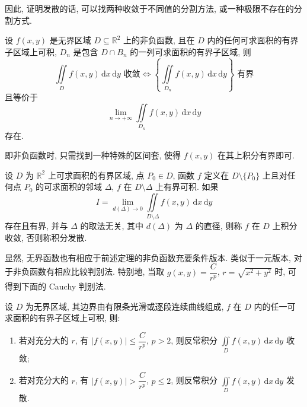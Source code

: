 \documentclass[../数学分析培优讲义.tex]{subfiles}
\begin{document}
\begin{remark}
因此, 证明发散的话, 可以找两种收敛于不同值的分割方法, 或一种极限不存在的分割方式.
\end{remark}

\begin{theorem}[\markstar]
设 $f(x,y)$ 是无界区域 $D\subseteq\mathbb{R}^2$ 上的非负函数, 且在 $D$ 内的任何可求面积的有界子区域上可积, $D_n$ 是包含 $D\cap B_n$ 的一列可求面积的有界子区域, 则
\[
    \iint\limits_D f(x,y)\,\mathrm{d}x\,\mathrm{d}y\text{ 收敛}
    \iff
    \left\{\iint\limits_{D_n}f(x,y)\,\mathrm{d}x\,\mathrm{d}y\right\}\text{ 有界}
\]
且等价于
\[
    \lim\limits_{n\to+\infty}\iint\limits_{D_n}f(x,y)\,\mathrm{d}x\,\mathrm{d}y
\]
存在.
\end{theorem}

\begin{remark}
即非负函数时, 只需找到一种特殊的区间套, 使得 $f(x,y)$ 在其上积分有界即可.
\end{remark}

\begin{definition}[无界函数]
设 $D$ 为 $\mathbb{R}^2$ 上可求面积的有界区域, 点 $P_0\in D$, 函数 $f$ 定义在 $D\setminus\{P_0\}$ 上且对任何点 $P_0$ 的可求面积的邻域 $\Delta$, $f$ 在 $D\setminus\Delta$ 上有界可积. 如果
\[
    I=\lim\limits_{d(\Delta)\to0}\iint\limits_{D\setminus\Delta}f(x,y)\,\mathrm{d}x\,\mathrm{d}y
\]
存在且有界, 并与 $\Delta$ 的取法无关, 其中 $d(\Delta)$ 为 $\Delta$ 的直径, 则称 $f$ 在 $D$ 上积分收敛, 否则称积分发散.
\end{definition}

\begin{remark}
显然, 无界函数也有相应于前述定理的非负函数充要条件版本. 类似于一元版本, 对于非负函数有相应比较判别法. 特别地, 当取 $g(x,y)=\dfrac{C}{r^p}$, $r=\sqrt{x^2+y^2}$ 时, 可得到下面的 Cauchy 判别法.
\end{remark}

\begin{theorem}
设 $D$ 为无界区域, 其边界由有限条光滑或逐段连续曲线组成, $f$ 在 $D$ 内的任一可求面积的有界子区域上可积, 则:
\begin{enumerate}[label=(\arabic*)]
    \item 若对充分大的 $r$, 有 $|f(x,y)|\leq\dfrac{C}{r^p}$, $p>2$, 则反常积分 $\displaystyle\iint\limits_Df(x,y)\,\mathrm{d}x\,\mathrm{d}y$ 收敛;
    \item 若对充分大的 $r$, 有 $|f(x,y)|>\dfrac{C}{r^p}$, $p\leq2$, 则反常积分 $\displaystyle\iint\limits_Df(x,y)\,\mathrm{d}x\,\mathrm{d}y$ 发散.
\end{enumerate}
\end{theorem}
\end{document}

